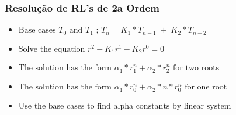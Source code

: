 \subsubsection{Resolução de RL's de 2a Ordem}
\begin{itemize}
	\item $\text{Base cases } T_{0} \text{ and } T_{1} \text{ ; }T_{n}=K_{1}*T_{n-1}\;\pm\;K_{2}*T_{n-2}$
	\item $\text{Solve the equation }r^{2}-K_{1}r^{1}-K_{2}r^{0}=0$
	\item $\text{The solution has the form }\alpha_{1}*r_{1}^{n}+ \alpha_{2}*r_{2}^{n}\text{ for two roots}$
	\item $\text{The solution has the form }\alpha_{1}*r_{0}^{n}+ \alpha_{2}*n*r_{0}^{n}\text{ for one root}$
	\item $\text{Use the base cases to find alpha constants by linear system}$
\end{itemize}